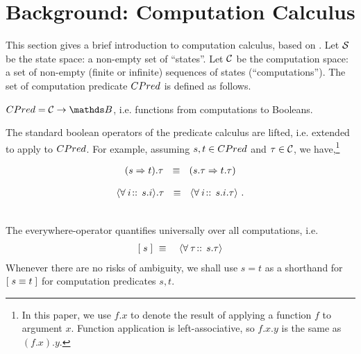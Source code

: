 
\section{Background: Computation Calculus}
\label{sec:background}

This section gives a brief introduction to computation calculus, based
on \cite{Dijkstra:1998p1128}.  Let $\mathcal{S}$ be the state space: a
non-empty set of ``states''.  Let $\mathcal{C}$ be the computation
space: a set of non-empty (finite or infinite) sequences of states
(``computations'').  The set of computation predicate $CPred$ 
is defined as follows.
%
\begin{Definition}
  $\CPred = \Computation \rightarrow \BOOL$, i.e. functions from
  computations to Booleans.
\end{Definition}

The standard boolean operators of the predicate calculus are lifted,
i.e. extended to apply to $CPred$. For example, assuming $s, t \in
CPred$ and $\tau \in \mathcal{C}$, we have,\footnote{
  In this paper, we use $f.x$ to denote the result of applying a
  function $f$ to argument $x$.  Function application is
  left-associative, so $f.x.y$ is the same as $(f.x).y$.
}%
%

  \begin{minipage}{0.45\linewidth}
    \begin{eqnarray}
(s \Rightarrow t).\tau  ~~\equiv~~  (s.\tau \Rightarrow
t.\tau) \label{eq:comp-impl} 
    \end{eqnarray}
  \end{minipage}
  \hfill
  \begin{minipage}{0.45\linewidth}
    \begin{eqnarray}
{ \langle \forall \:i\!:\, \!:\, s.i \rangle }.\tau  ~~\equiv~~
{ \langle \forall \:i\!:\, \!:\, s.i.\tau \rangle }~. \label{eq:comp-forall}
    \end{eqnarray}
  \end{minipage}
\\

The everywhere-operator quantifies universally over all
computations, i.e.
%
\begin{eqnarray} 
[\; s \;] & ~\equiv ~& { \langle \forall \:\tau\!:\, \!:\, s.\tau \rangle } \label{eq:comp-ew}
\end{eqnarray}
%
Whenever there are no risks of ambiguity, we
shall use $s = t$ as a shorthand for $[\; s \equiv t \;]$ for computation
predicates $s, t$.

